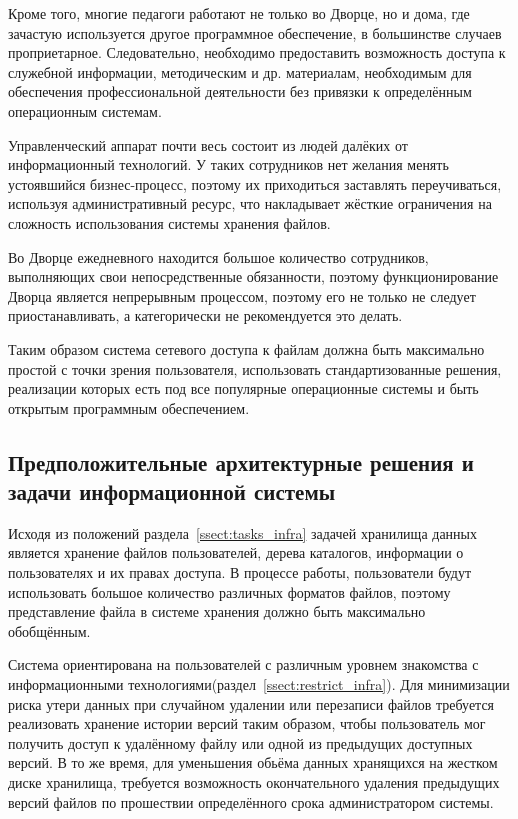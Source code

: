 \documentclass[utf8,usehyperref,12pt]{G7-32}
\begin{document}
Кроме того, многие педагоги работают не только во Дворце, но и дома, где зачастую используется другое программное обеспечение, в большинстве случаев проприетарное. Следовательно, необходимо предоставить возможность доступа к служебной информации, методическим и др. материалам, необходимым для обеспечения профессиональной деятельности без привязки к определённым операционным системам.

Управленческий аппарат почти весь состоит из людей далёких от информационный технологий. У таких сотрудников нет желания менять устоявшийся бизнес-процесс, поэтому их приходиться заставлять переучиваться, используя административный ресурс, что накладывает жёсткие ограничения на сложность использования системы хранения файлов.


Во Дворце ежедневного находится большое количество сотрудников, выполняющих свои непосредственные обязанности, поэтому функционирование Дворца является непрерывным процессом, поэтому его не только не следует приостанавливать,
а категорически не рекомендуется это делать.

Таким образом система сетевого доступа к файлам должна быть максимально простой с точки зрения пользователя, использовать стандартизованные решения, реализации которых есть под все популярные операционные системы и быть открытым программным обеспечением.

\subsection{Предположительные архитектурные решения и задачи информационной системы}\label{ssect_arch_tasks}
Исходя из положений раздела~\ref{ssect:tasks_infra} задачей хранилища данных является хранение файлов пользователей, дерева каталогов, информации о пользователях и их правах доступа. В процессе работы, пользователи будут использовать большое количество различных форматов файлов, поэтому представление файла в системе хранения должно быть максимально обобщённым. 

Система ориентирована на пользователей с различным уровнем знакомства с информационными технологиями(раздел~\ref{ssect:restrict_infra}). Для минимизации риска утери данных при случайном удалении или перезаписи файлов требуется реализовать хранение истории версий таким образом, чтобы пользователь мог получить доступ к удалённому файлу или одной из предыдущих доступных версий. В то же время, для уменьшения обьёма данных хранящихся на жестком диске хранилища, требуется возможность окончательного удаления предыдущих версий файлов по прошествии определённого срока администратором системы.
\end{document}

